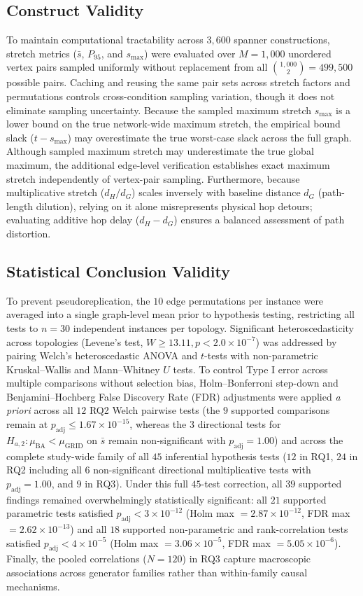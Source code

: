 \documentclass[conference]{IEEEtran}
\begin{document}
\subsection{Construct Validity}
To maintain computational tractability across $3,600$ spanner constructions, stretch metrics ($\bar{s}$, $P_{95}$, and $s_{\max}$) were evaluated over $M = 1,000$ unordered vertex pairs sampled uniformly without replacement from all $\binom{1,000}{2} = 499,500$ possible pairs. Caching and reusing the same pair sets across stretch factors and permutations controls cross-condition sampling variation, though it does not eliminate sampling uncertainty. Because the sampled maximum stretch $s_{\max}$ is a lower bound on the true network-wide maximum stretch, the empirical bound slack ($t - s_{\max}$) may overestimate the true worst-case slack across the full graph. Although sampled maximum stretch may underestimate the true global maximum, the additional edge-level verification establishes exact maximum stretch independently of vertex-pair sampling. Furthermore, because multiplicative stretch ($d_H / d_G$) scales inversely with baseline distance $d_G$ (path-length dilution), relying on it alone misrepresents physical hop detours; evaluating additive hop delay ($d_H - d_G$) ensures a balanced assessment of path distortion.

\subsection{Statistical Conclusion Validity}
To prevent pseudoreplication, the $10$ edge permutations per instance were averaged into a single graph-level mean prior to hypothesis testing, restricting all tests to $n = 30$ independent instances per topology. Significant heteroscedasticity across topologies (Levene's test, $W \ge 13.11, p < 2.0 \times 10^{-7}$) was addressed by pairing Welch's heteroscedastic ANOVA \cite{ref27} and $t$-tests with non-parametric Kruskal--Wallis and Mann--Whitney $U$ tests. To control Type I error across multiple comparisons without selection bias, Holm--Bonferroni step-down and Benjamini--Hochberg False Discovery Rate (FDR) adjustments were applied \textit{a priori} across all $12$ RQ2 Welch pairwise tests (the $9$ supported comparisons remain at $p_{\mathrm{adj}} \le 1.67 \times 10^{-15}$, whereas the $3$ directional tests for $H_{a,2}: \mu_{\mathrm{BA}} < \mu_{\mathrm{GRID}}$ on $\bar{s}$ remain non-significant with $p_{\mathrm{adj}} = 1.00$) and across the complete study-wide family of all $45$ inferential hypothesis tests ($12$ in RQ1, $24$ in RQ2 including all $6$ non-significant directional multiplicative tests with $p_{\mathrm{adj}} = 1.00$, and $9$ in RQ3). Under this full $45$-test correction, all $39$ supported findings remained overwhelmingly statistically significant: all $21$ supported parametric tests satisfied $p_{\mathrm{adj}} < 3 \times 10^{-12}$ (Holm max $= 2.87 \times 10^{-12}$, FDR max $= 2.62 \times 10^{-13}$) and all $18$ supported non-parametric and rank-correlation tests satisfied $p_{\mathrm{adj}} < 4 \times 10^{-5}$ (Holm max $= 3.06 \times 10^{-5}$, FDR max $= 5.05 \times 10^{-6}$). Finally, the pooled correlations ($N = 120$) in RQ3 capture macroscopic associations across generator families rather than within-family causal mechanisms.
\end{document}
